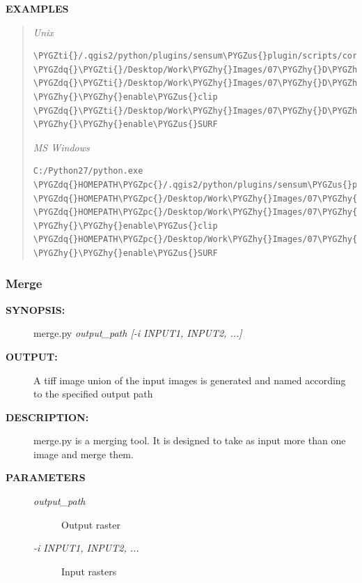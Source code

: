 \documentclass[letterpaper,10pt,english]{sphinxmanual}
\def\PYGZus{\char`\_}
\def\PYGZpc{\char`\%}
\def\PYGZhy{\char`\-}
\def\PYGZdq{\char`\"}
\def\PYGZti{\char`\~}
\begin{document}
\textbf{EXAMPLES}
\begin{quote}

\emph{Unix}

\begin{Verbatim}[frame=single,commandchars=\\\{\}]
\PYGZti{}/.qgis2/python/plugins/sensum\PYGZus{}plugin/scripts/coregistration.py \PYGZdq{}\PYGZti{}/Desktop/Work\PYGZhy{}Images/07\PYGZhy{}D\PYGZhy{}Case12/2007\PYGZhy{}07\PYGZhy{}24\PYGZdq{} \PYGZdq{}\PYGZti{}/Desktop/Work\PYGZhy{}Images/07\PYGZhy{}D\PYGZhy{}Case12\PYGZdq{} \PYGZhy{}\PYGZhy{}enable\PYGZus{}clip \PYGZdq{}\PYGZti{}/Desktop/Work\PYGZhy{}Images/07\PYGZhy{}D\PYGZhy{}Case12/Mask\PYGZus{}reclass1\PYGZus{}Identity.shp\PYGZdq{}  \PYGZhy{}\PYGZhy{}enable\PYGZus{}SURF
\end{Verbatim}

\emph{MS Windows}

\begin{Verbatim}[frame=single,commandchars=\\\{\}]
C:/Python27/python.exe \PYGZdq{}HOMEPATH\PYGZpc{}/.qgis2/python/plugins/sensum\PYGZus{}plugin/scripts/coregistration.py\PYGZdq{} \PYGZdq{}HOMEPATH\PYGZpc{}/Desktop/Work\PYGZhy{}Images/07\PYGZhy{}D\PYGZhy{}Case12/2007\PYGZhy{}07\PYGZhy{}24\PYGZdq{} \PYGZdq{}HOMEPATH\PYGZpc{}/Desktop/Work\PYGZhy{}Images/07\PYGZhy{}D\PYGZhy{}Case12\PYGZdq{} \PYGZhy{}\PYGZhy{}enable\PYGZus{}clip \PYGZdq{}HOMEPATH\PYGZpc{}/Desktop/Work\PYGZhy{}Images/07\PYGZhy{}D\PYGZhy{}Case12/Mask\PYGZus{}reclass1\PYGZus{}Identity.shp\PYGZdq{}  \PYGZhy{}\PYGZhy{}enable\PYGZus{}SURF
\end{Verbatim}
\end{quote}


\subsubsection{Merge}
\label{user:merge}\begin{description}
\item[{\textbf{SYNOPSIS:}}] \leavevmode
merge.py \emph{output\_path {[}-i INPUT1, INPUT2, ...{]}}

\item[{\textbf{OUTPUT:}}] \leavevmode
A tiff image union of the input images is generated and named according to the specified output path

\item[{\textbf{DESCRIPTION:}}] \leavevmode
merge.py is a merging tool. It is designed to take as input more than one image and merge them.

\item[{\textbf{PARAMETERS}}] \leavevmode\begin{description}
\item[{\emph{output\_path}}] \leavevmode
Output raster

\item[{\emph{-i INPUT1, INPUT2, ...}}] \leavevmode
Input rasters

\end{description}

\end{description}
\end{document}
